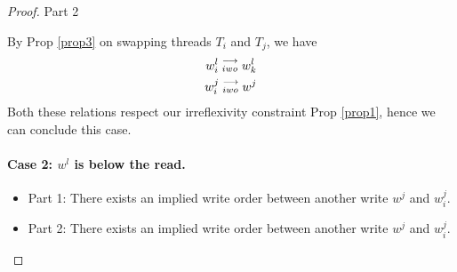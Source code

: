 \begin{proof}{Part 2}
\begin{itemize}
                        By Prop \ref{prop3} on swapping threads $T_i$ and $T_j$, we have 
                        \begin{align*}
                            w_i^l\stackrel{\longrightarrow}{_{iwo}}w_k^l \\ 
                            w_i^j\stackrel{\longrightarrow}{_{iwo}}w^j
                        \end{align*}
                        Both these relations respect our irreflexivity constraint Prop \ref{prop1}, hence we can conclude this case. 

                \end{itemize}

            \paragraph{Case 2: $w^l$ is below the read.}

                \begin{itemize}
                    \item Part 1: There exists an implied write order between another write $w^j$ and $w_i^j$.

                    \item Part 2: There exists an implied write order between another write $w^j$ and $w_i^j$.
                    
                \end{itemize}

            
        \end{proof}
   